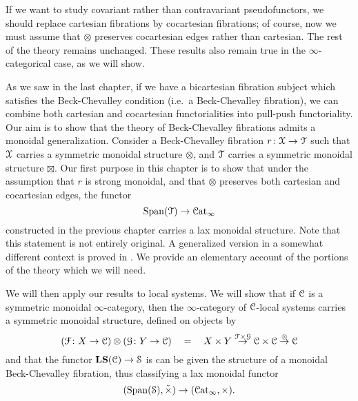 \documentclass[main.tex]{subfiles}
\begin{document}
If we want to study covariant rather than contravariant pseudofunctors, we should replace cartesian fibrations by cocartesian fibrations; of course, now we must assume that $\otimes$ preserves cocartesian edges rather than cartesian. The rest of the theory remains unchanged. These results also remain true in the $\infty$-categorical case, as we will show.

As we saw in the last chapter, if we have a bicartesian fibration subject which satisfies the Beck-Chevalley condition (i.e.\ a Beck-Chevalley fibration), we can combine both cartesian and cocartesian functorialities into pull-push functoriality. Our aim is to show that the theory of Beck-Chevalley fibrations admits a monoidal generalization. Consider a Beck-Chevalley fibration $r\colon \mathcal{X} \to \mathcal{T}$ such that $\mathcal{X}$ carries a symmetric monoidal structure $\otimes$, and $\mathcal{T}$ carries a symmetric monoidal structure $\boxtimes$. Our first purpose in this chapter is to show that under the assumption that $r$ is strong monoidal, and that $\otimes$ preserves both cartesian and cocartesian edges, the functor
\begin{equation*}
  \mathrm{Span}(\mathcal{T}) \to \mathcal{C}\mathrm{at}_{\infty}
\end{equation*}
constructed in the previous chapter carries a lax monoidal structure. Note that this statement is not entirely original. A generalized version in a somewhat different context is proved in \cite{spectralmackeyfunctors2}. We provide an elementary account of the portions of the theory which we will need.

We will then apply our results to local systems. We will show that if $\mathcal{C}$ is a symmetric monoidal $\infty$-category, then the $\infty$-category of $\mathcal{C}$-local systems carries a symmetric monoidal structure, defined on objects by
\begin{equation*}
  (\mathcal{F}\colon X \to \mathcal{C}) \otimes (\mathcal{G}\colon Y \to \mathcal{C}) \quad=\quad X \times Y \overset{\mathcal{F} \times \mathcal{G}}{\to} \mathcal{C} \times \mathcal{C} \overset{\otimes}{\to} \mathcal{C}
\end{equation*}
and that the functor $\mathbf{LS}(\mathcal{C}) \to \mathcal{S}$ is can be given the structure of a monoidal Beck-Chevalley fibration, thus classifying a lax monoidal functor
\begin{equation*}
  (\mathrm{Span}(\mathcal{S}), \tilde{\times}) \to (\mathcal{C}\mathrm{at}_{\infty}, \times).
\end{equation*}
\end{document}
